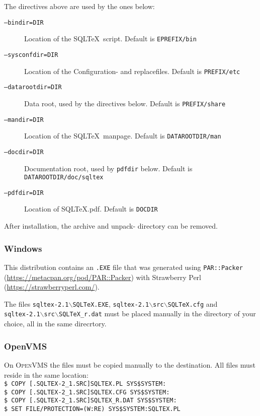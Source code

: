 \documentclass{article}
\newcommand{\vs}{\vspace{3mm}}
\begin{document}
The directives above are used by the ones below:

\begin{description}
\item[\texttt{--bindir=DIR}]            Location of the SQL\TeX\ script. Default is \texttt{EPREFIX/bin}
\item[\texttt{--sysconfdir=DIR}]        Location of the Configuration- and replacefiles. Default is \texttt{PREFIX/etc}
\item[\texttt{--datarootdir=DIR}]       Data root, used by  the directives below. Default is \texttt{PREFIX/share}
\item[\texttt{--mandir=DIR}]            Location of the SQL\TeX\ manpage. Default is \texttt{DATAROOTDIR/man}
\item[\texttt{--docdir=DIR}]            Documentation root, used by \texttt{pdfdir} below. Default is \texttt{DATAROOTDIR/doc/sqltex}
\item[\texttt{--pdfdir=DIR}]            Location of SQL\TeX.pdf. Default is \texttt{DOCDIR}
\end{description}

\vs

After installation, the archive and unpack- directory can be removed.

\subsubsection{Windows}

This distribution contains an \texttt{.EXE} file that was generated using \texttt{PAR::Packer} (\url{https://metacpan.org/pod/PAR::Packer}) with Strawberry Perl (\url{https://strawberryperl.com/}).

\vs

The files \texttt{sqltex-2.1\ensuremath{\backslash}SQLTeX.EXE}, \texttt{sqltex-2.1\ensuremath{\backslash}src\ensuremath{\backslash}SQLTeX.cfg} and \\ \texttt{sqltex-2.1\ensuremath{\backslash}src\ensuremath{\backslash}SQLTeX\_r.dat} must be placed manually in the directory of your choice, all in the same direcrtory.


\subsubsection{OpenVMS}

On \textsc{OpenVMS} the files must be copied manually to the destination. All files must reside in the same location:\\
\texttt{\$ COPY [.SQLTEX-2\_1.SRC]SQLTEX.PL SYS\$SYSTEM:\\
\$ COPY [.SQLTEX-2\_1.SRC]SQLTEX.CFG SYS\$SYSTEM:\\
\$ COPY [.SQLTEX-2\_1.SRC]SQLTEX\_R.DAT SYS\$SYSTEM:\\
\$ SET FILE/PROTECTION=(W:RE) SYS\$SYSTEM:SQLTEX.PL}
\end{document}
